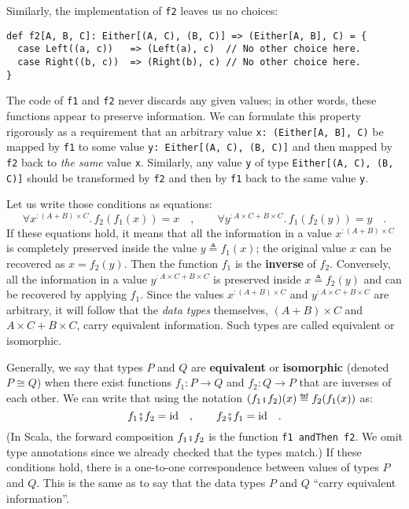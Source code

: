 Similarly, the implementation of \lstinline!f2! leaves us no choices:
\begin{lstlisting}
def f2[A, B, C]: Either[(A, C), (B, C)] => (Either[A, B], C) = {
  case Left((a, c))   => (Left(a), c)  // No other choice here.
  case Right((b, c))  => (Right(b), c) // No other choice here.
}
\end{lstlisting}
The code of \lstinline!f1! and \lstinline!f2! never discards any
given values; in other words, these functions appear to preserve information.
We can formulate this property rigorously as a requirement that an
arbitrary value \lstinline!x: (Either[A, B], C)! be mapped by \lstinline!f1!
to some value \lstinline!y: Either[(A, C), (B, C)]! and then mapped
by \lstinline!f2! back to \emph{the same} value \lstinline!x!. Similarly,
any value \lstinline!y! of type \lstinline!Either[(A, C), (B, C)]!
should be transformed by \lstinline!f2! and then by \lstinline!f1!
back to the same value \lstinline!y!.

Let us write those conditions as equations:
\[
\forall x^{:(A+B)\times C}.\,f_{2}(f_{1}(x))=x\quad,\quad\quad\forall y^{:A\times C+B\times C}.\,f_{1}\left(f_{2}(y)\right)=y\quad.
\]
If these equations hold, it means that all the information in a value
$x^{:(A+B)\times C}$ is completely preserved inside the value $y\triangleq f_{1}(x)$;
the original value $x$ can be recovered as $x=f_{2}(y)$. Then the
function $f_{1}$ is the \textbf{inverse}
of $f_{2}$. Conversely, all the information in a value $y^{:A\times C+B\times C}$
is preserved inside $x\triangleq f_{2}(y)$ and can be recovered by
applying $f_{1}$. Since the values $x^{:(A+B)\times C}$ and $y^{:A\times C+B\times C}$
are arbitrary, it will follow that the \emph{data types} themselves,
$\left(A+B\right)\times C$ and $A\times C+B\times C$, carry equivalent
information. Such types are called equivalent
or isomorphic.

Generally, we say that types $P$ and $Q$ are \textbf{equivalent}
or \textbf{isomorphic} (denoted $P\cong Q$) when
there exist functions $f_{1}:P\rightarrow Q$ and $f_{2}:Q\rightarrow P$
that are inverses of each other. We can write that using the notation
$(f_{1}\bef f_{2})(x)\triangleq f_{2}(f_{1}(x))$ as:
\[
f_{1}\bef f_{2}=\text{id}\quad,\quad\quad f_{2}\bef f_{1}=\text{id}\quad.
\]
(In Scala, the forward composition $f_{1}\bef f_{2}$ is the function
\lstinline!f1 andThen f2!. We omit type annotations since we already
checked that the types match.) If these conditions hold, there is
a one-to-one correspondence between values of types $P$ and $Q$.
This is the same as to say that the data types $P$ and $Q$ \textsf{``}carry
equivalent information\textsf{''}.

